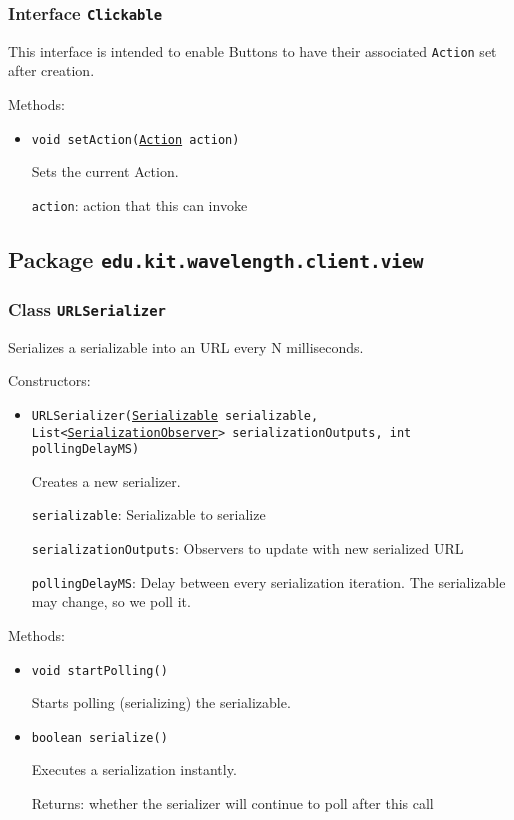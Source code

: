 \subsubsection{Interface \texttt{Clickable}}
\label{type:edu.kit.wavelength.client.view.api.Clickable}
This interface is intended to enable Buttons to have their associated
 \texttt{Action} set after creation.

Methods:
\begin{itemize}
\item \texttt{void setAction(\hyperref[type:edu.kit.wavelength.client.view.action.Action]{Action} action)}

Sets the current Action.

\texttt{action}: action that this can invoke

\end{itemize}

\subsection{Package \lstinline{edu.kit.wavelength.client.view}}
\label{pkg:edu.kit.wavelength.client.view}


\subsubsection{Class \texttt{URLSerializer}}
\label{type:edu.kit.wavelength.client.view.URLSerializer}
Serializes a serializable into an URL every N milliseconds.

Constructors:
\begin{itemize}
\item \texttt{URLSerializer(\hyperref[type:edu.kit.wavelength.client.model.serialization.Serializable]{Serializable} serializable, List<\hyperref[type:edu.kit.wavelength.client.view.SerializationObserver]{SerializationObserver}> serializationOutputs, int pollingDelayMS)}

Creates a new serializer.

\texttt{serializable}: Serializable to serialize

\texttt{serializationOutputs}: Observers to update with new serialized URL

\texttt{pollingDelayMS}: Delay between every serialization iteration. The serializable may change, so we poll it.

\end{itemize}

Methods:
\begin{itemize}
\item \texttt{void startPolling()}

Starts polling (serializing) the serializable.

\item \texttt{boolean serialize()}

Executes a serialization instantly.

Returns: whether the serializer will continue to poll after this call

\end{itemize}

